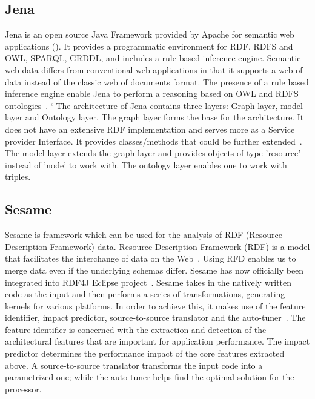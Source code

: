      \pv

\subsection{Jena }

Jena is an open source Java Framework provided by Apache for semantic
web applications (\cite{www-w3-jena}). It provides a programmatic
environment for RDF, RDFS and OWL, SPARQL, GRDDL, and includes a
rule-based inference engine. Semantic web data differs from
conventional web applications in that it supports a web of data
instead of the classic web of documents format. The presence of a rule
based inference engine enable Jena to perform a reasoning based on OWL
and RDFS ontologies~\cite{www-trimc-nlp-blogspot}. ` The architecture
of Jena contains three layers: Graph layer, model layer and Ontology
layer. The graph layer forms the base for the architecture. It does
not have an extensive RDF implementation and serves more as a Service
provider Interface. It provides classes/methods that could be further
extended~\cite{www-trimc-nlp-blogspot}.  The model layer extends the
graph layer and provides objects of type 'resource' instead of 'node'
to work with.  The ontology layer enables one to work with triples.

     \pv

\subsection{Sesame}

Sesame is framework which can be used for the analysis of RDF
(Resource Description Framework) data.  Resource Description Framework
(RDF) is a model that facilitates the interchange of data on the
Web~\cite{www-RDF}.  Using RFD enables us to merge data even if the
underlying schemas differ.  Sesame has now officially been integrated
into RDF4J Eclipse project~\cite{www-sesame}.  Sesame takes in the
natively written code as the input and then performs a series of
transformations, generating kernels for various platforms.  In order
to achieve this, it makes use of the feature identifier, impact
predictor, source-to-source translator and the
auto-tuner~\cite{sesame-paper-2013}.  The feature identifier is
concerned with the extraction and detection of the architectural
features that are important for application performance.  The impact
predictor determines the performance impact of the core features
extracted above.  A source-to-source translator transforms the input
code into a parametrized one; while the auto-tuner helps find the
optimal solution for the processor.

